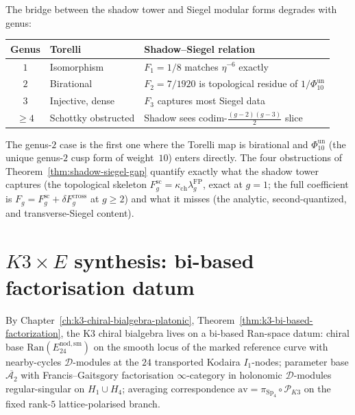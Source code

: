 \begin{remark}
\label{rem:genus-stratification}
The bridge between the shadow tower and Siegel modular
forms degrades with genus:
\begin{center}
\small
\renewcommand{\arraystretch}{1.2}
\begin{tabular}{cll}
\textbf{Genus} & \textbf{Torelli} & \textbf{Shadow--Siegel relation} \\
\hline
$1$ & Isomorphism & $F_1 = 1/8$ matches $\eta^{-6}$ exactly \\
$2$ & Birational & $F_2 = 7/1920$ is topological residue of \(1/\Phi_{10}^{\mathrm{un}}\) \\
$3$ & Injective, dense & $F_3$ captures most Siegel data \\
$\geq 4$ & Schottky obstructed & Shadow sees codim-$\frac{(g{-}2)(g{-}3)}{2}$ slice
\end{tabular}
\end{center}
The genus-$2$ case is the first one where the Torelli map is
birational and \(\Phi_{10}^{\mathrm{un}}\) (the unique genus-$2$
cusp form of weight~$10$) enters directly. The
four obstructions of
Theorem~\ref{thm:shadow-siegel-gap} quantify exactly
what the shadow tower captures (the topological skeleton
$F_g^{\mathrm{sc}} = \kappa_{\mathrm{ch}}\lambda_g^{\mathrm{FP}}$,
exact at $g = 1$; the full coefficient is
$F_g=F_g^{\mathrm{sc}}+\delta F_g^{\mathrm{cross}}$ at $g \geq 2$) and what it
misses (the analytic, second-quantized, and transverse-Siegel
content).
\end{remark}

\section{\texorpdfstring{$K3\times E$}{K3x E} synthesis: bi-based factorisation datum}
\label{sec:k3e-cy3-synthesis-bi-based}

\begin{remark}
\label{rem:k3e-cy3-bi-based}
By Chapter~\ref{ch:k3-chiral-bialgebra-platonic}, Theorem~\ref{thm:k3-bi-based-factorization}, the K3 chiral bialgebra lives on a bi-based Ran-space datum: chiral base $\mathrm{Ran}(E^{\mathrm{nod,sm}}_{24})$ on the smooth locus of the marked reference curve with nearby-cycles $\mathcal{D}$-modules at the $24$ transported Kodaira $I_1$-nodes; parameter base $\overline{\mathcal{A}_2}$ with Francis--Gaitsgory factorisation $\infty$-category in holonomic $\mathcal{D}$-modules regular-singular on $H_1\cup H_4$; averaging correspondence $\mathrm{av}=\pi_{\mathrm{Sp}_4}\circ\mathscr P_{K3}$ on the fixed rank-\(5\) lattice-polarised branch.
\end{remark}

